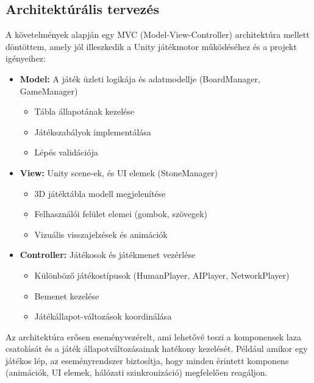 \subsection{Architektúrális tervezés}
A követelmények alapján egy MVC (Model-View-Controller) architektúra mellett döntöttem, amely jól illeszkedik a Unity játékmotor működéséhez és a projekt igényeihez:
\begin{itemize}
	\item \textbf{Model:} A játék üzleti logikája és adatmodellje (BoardManager, GameManager)
	\begin{itemize}
		\item Tábla állapotának kezelése
		\item Játékszabályok implementálása
		\item Lépés validációja
	\end{itemize}
	\item \textbf{View:} Unity scene-ek, és UI elemek (StoneManager)
	\begin{itemize}
		\item 3D játéktábla modell megjelenítése
		\item Felhasználói felület elemei (gombok, szövegek)
		\item Vizuális visszajelzések és animációk
	\end{itemize}
	
	\item \textbf{Controller:} Játékosok és játékmenet vezérlése
	\begin{itemize}
		\item Különböző játékostípusok (HumanPlayer, AIPlayer, NetworkPlayer)
		\item Bemenet kezelése
		\item Játékállapot-változások koordinálása
	\end{itemize}
\end{itemize}
Az architektúra erősen eseményvezérelt, ami lehetővé teszi a komponensek laza csatolását és a játék állapotváltozásainak hatékony kezelését. Például amikor egy játékos lép, az eseményrendszer biztosítja, hogy minden érintett komponens (animációk, UI elemek, hálózati szinkronizáció) megfelelően reagáljon.
